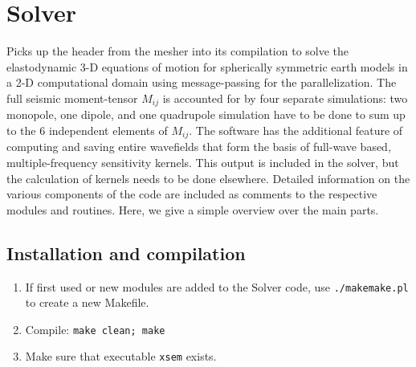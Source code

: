 \documentclass[11pt,letter,fleqn,english,notitlepage]{article}
\begin{document}
\section{Solver}
Picks up the header from the mesher into its compilation to solve the
elastodynamic 3-D equations of motion for spherically symmetric earth models in
a 2-D computational domain using message-passing for the parallelization. The
full seismic moment-tensor $M_{ij}$ is accounted for by four separate
simulations: two monopole, one dipole, and one quadrupole simulation have to be
done to sum up to the 6 independent elements of $M_{ij}$.  The software has the
additional feature of computing and saving entire wavefields that form the
basis of full-wave based, multiple-frequency sensitivity kernels. This output
is included in the solver, but the calculation of kernels needs to be done
elsewhere.  Detailed information on the various components of the code are
included as comments to the respective modules and routines. Here, we give a
simple overview over the main parts. 

\newpage
\subsection{Installation and compilation}
\begin{enumerate}
    \item If first used or new modules are added to the Solver code,
    use {\tt ./makemake.pl } to create a new Makefile.    


    \item Compile: {\tt make clean; make}
    \item Make sure that executable {\tt xsem} exists.
\end{enumerate}

\end{document}
